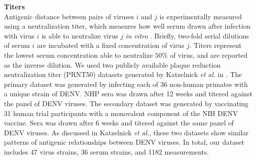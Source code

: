 \documentclass[11pt,oneside,letterpaper]{article}
\begin{document}
\textbf{Titers}\\

Antigenic distance between pairs of viruses $i$ and $j$ is experimentally measured using a neutralization titer, which measures how well serum drawn after infection with virus $i$ is able to neutralize virus $j$ \textit{in vitro} \citep{russell1967dengue}.
Briefly, two-fold serial dilutions of serum $i$ are incubated with a fixed concentration of virus $j$.
Titers represent the lowest serum concentration able to neutralize $50\%$ of virus, and are reported as the inverse dilution.
We used two publicly available plaque reduction neutralization titer (PRNT50) datasets generated by Katzelnick \textit{et al.} in \citep{katzelnick2015dengue}.
The primary dataset was generated by infecting each of 36 non-human primates with a unique strain of DENV.
NHP sera was drawn after 12 weeks and titered against the panel of DENV viruses.
The secondary dataset was generated by vaccinating 31 human trial participants with a monovalent component of the NIH DENV vaccine.
Sera was drawn after 6 weeks and titered against the same panel of DENV viruses.
As discussed in Katzelnick \textit{et al.}, these two datasets show similar patterns of antigenic relationships between DENV viruses.
In total, our dataset includes 47 virus strains, 36 serum strains, and 1182 measurements.
\end{document}
